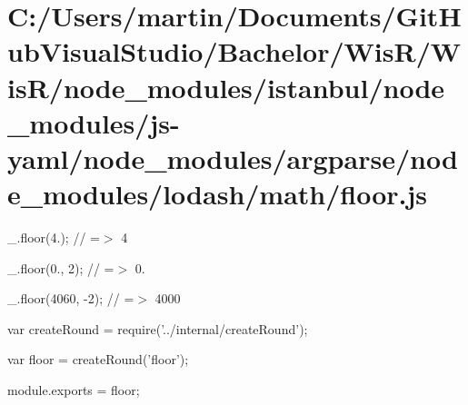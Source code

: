 \hypertarget{_c_1_2_users_2martin_2_documents_2_git_hub_visual_studio_2_bachelor_2_wis_r_2_wis_r_2node_module9b5427d984ef970e4a0ea91672ed848b}{}\section{C\+:/\+Users/martin/\+Documents/\+Git\+Hub\+Visual\+Studio/\+Bachelor/\+Wis\+R/\+Wis\+R/node\+\_\+modules/istanbul/node\+\_\+modules/js-\/yaml/node\+\_\+modules/argparse/node\+\_\+modules/lodash/math/floor.\+js}
\+\_\+.\+floor(4.); // =$>$ 4

\+\_\+.\+floor(0., 2); // =$>$ 0.

\+\_\+.\+floor(4060, -\/2); // =$>$ 4000


\begin{DoxyCodeInclude}
var createRound = require(\textcolor{stringliteral}{'../internal/createRound'});

var floor = createRound(\textcolor{stringliteral}{'floor'});

module.exports = floor;
\end{DoxyCodeInclude}
 